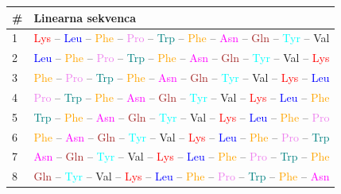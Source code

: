 \documentclass[12pt,oneside]{memoir}
\begin{document}
\begin{table}[H]
\centering
\begin{tabular}{ll}
\toprule
\# & Linearna sekvenca \\
\midrule
1 & \textcolor{red}{Lys} – \textcolor{blue}{Leu} – \textcolor{orange}{Phe} – \textcolor{violet}{Pro} – \textcolor{teal}{Trp} – \textcolor{orange}{Phe} – \textcolor{magenta}{Asn} – \textcolor{brown}{Gln} – \textcolor{cyan}{Tyr} – \textcolor{green!70!black}{Val} \\
2 & \textcolor{blue}{Leu} – \textcolor{orange}{Phe} – \textcolor{violet}{Pro} – \textcolor{teal}{Trp} – \textcolor{orange}{Phe} – \textcolor{magenta}{Asn} – \textcolor{brown}{Gln} – \textcolor{cyan}{Tyr} – \textcolor{green!70!black}{Val} – \textcolor{red}{Lys} \\
3 & \textcolor{orange}{Phe} – \textcolor{violet}{Pro} – \textcolor{teal}{Trp} – \textcolor{orange}{Phe} – \textcolor{magenta}{Asn} – \textcolor{brown}{Gln} – \textcolor{cyan}{Tyr} – \textcolor{green!70!black}{Val} – \textcolor{red}{Lys} – \textcolor{blue}{Leu} \\
4 & \textcolor{violet}{Pro} – \textcolor{teal}{Trp} – \textcolor{orange}{Phe} – \textcolor{magenta}{Asn} – \textcolor{brown}{Gln} – \textcolor{cyan}{Tyr} – \textcolor{green!70!black}{Val} – \textcolor{red}{Lys} – \textcolor{blue}{Leu} – \textcolor{orange}{Phe} \\
5 & \textcolor{teal}{Trp} – \textcolor{orange}{Phe} – \textcolor{magenta}{Asn} – \textcolor{brown}{Gln} – \textcolor{cyan}{Tyr} – \textcolor{green!70!black}{Val} – \textcolor{red}{Lys} – \textcolor{blue}{Leu} – \textcolor{orange}{Phe} – \textcolor{violet}{Pro} \\
6 & \textcolor{orange}{Phe} – \textcolor{magenta}{Asn} – \textcolor{brown}{Gln} – \textcolor{cyan}{Tyr} – \textcolor{green!70!black}{Val} – \textcolor{red}{Lys} – \textcolor{blue}{Leu} – \textcolor{orange}{Phe} – \textcolor{violet}{Pro} – \textcolor{teal}{Trp} \\
7 & \textcolor{magenta}{Asn} – \textcolor{brown}{Gln} – \textcolor{cyan}{Tyr} – \textcolor{green!70!black}{Val} – \textcolor{red}{Lys} – \textcolor{blue}{Leu} – \textcolor{orange}{Phe} – \textcolor{violet}{Pro} – \textcolor{teal}{Trp} – \textcolor{orange}{Phe} \\
8 & \textcolor{brown}{Gln} – \textcolor{cyan}{Tyr} – \textcolor{green!70!black}{Val} – \textcolor{red}{Lys} – \textcolor{blue}{Leu} – \textcolor{orange}{Phe} – \textcolor{violet}{Pro} – \textcolor{teal}{Trp} – \textcolor{orange}{Phe} – \textcolor{magenta}{Asn} \\

\end{tabular}
\end{table}
\end{document}
